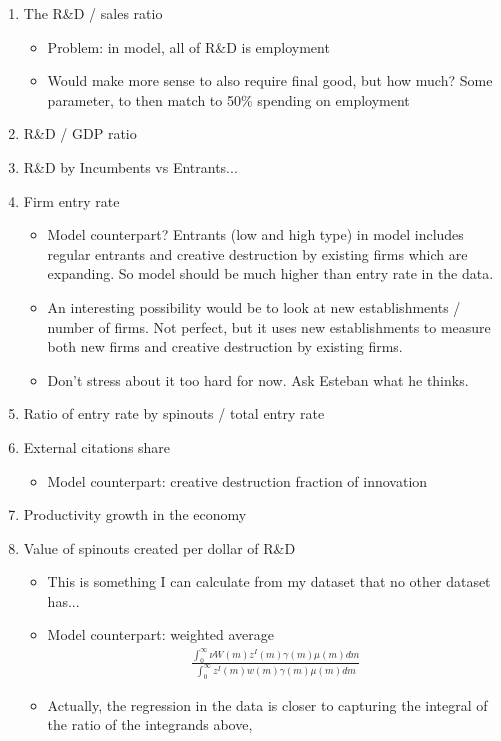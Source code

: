 \documentclass[12pt,english]{article}
\theoremstyle{remark}
\begin{document}
\begin{enumerate}
	\item The R\&D / sales ratio
	\begin{itemize}
		\item Problem: in model, all of R\&D is employment
		\item Would make more sense to also require final good, but how much? Some parameter, to then match to 50\% spending on employment
	\end{itemize}
	\item R\&D / GDP ratio
	\item R\&D by Incumbents vs Entrants...
	\item Firm entry rate
	\begin{itemize}
		\item Model counterpart? Entrants (low and high type) in model includes regular entrants and creative destruction by existing firms which are expanding. So model should be much higher than entry rate in the data.
		\item An interesting possibility would be to look at new establishments / number of firms. Not perfect, but it uses new establishments to measure both new firms and creative destruction by existing firms. 
		\item Don't stress about it too hard for now. Ask Esteban what he thinks.
	\end{itemize}
	\item Ratio of entry rate by spinouts / total entry rate
	\item External citations share
	\begin{itemize}
		\item Model counterpart: creative destruction fraction of innovation
	\end{itemize}
	\item Productivity growth in the economy
	\item Value of spinouts created per dollar of R\&D
	\begin{itemize}
		\item This is something I can calculate from my dataset that no other dataset has...
		\item Model counterpart: weighted average
		\begin{align*}
			\frac{\int_0^{\infty} \nu W(m) z^I(m) \gamma(m) \mu(m) dm}{\int_0^{\infty} z^I(m) w(m) \gamma(m) \mu(m) dm}
		\end{align*}
		\item Actually, the regression in the data is closer to capturing the integral of the ratio of the integrands above,

\end{itemize}
\end{enumerate}
\end{document}
